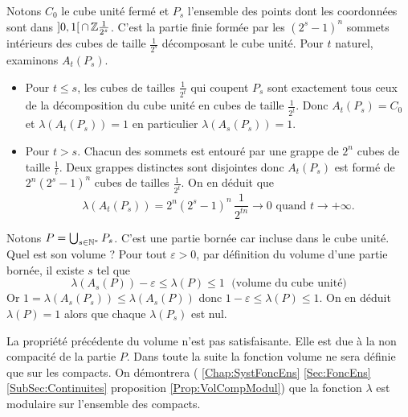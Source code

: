 \begin{explen}\label{exple:VolSommetsBorn}
Notons $C_0$ le cube unité fermé et $P_s$ l'ensemble des points dont les coordonnées sont dans $]0,1[\,\cap\, \mathbb{Z} \frac{1}{2^s}$. C'est la partie finie formée par les $(2^s -1)^n$ sommets intérieurs des cubes de taille $\frac{1}{2^s}$ décomposant le cube unité.\newline
Pour $t$ naturel, examinons $A_t(P_s)$.
  \begin{itemize}
    \item Pour $t \leq s$, les cubes de tailles $\frac{1}{2^t}$ qui coupent $P_s$ sont exactement tous ceux de la décomposition du cube unité en cubes de taille $\frac{1}{2^t}$. Donc $A_t(P_s) = C_0$ et $\lambda(A_t(P_s))=1$ en particulier $\lambda(A_s(P_s))=1$.
    \item Pour $t > s$. Chacun des sommets est entouré par une grappe de $2^n$ cubes de taille $\frac{1}{t}$. Deux grappes distinctes sont disjointes donc $A_t(P_s)$ est formé de $2^n (2^s -1)^n$ cubes de tailles $\frac{1}{2^t}$. On en déduit que
      \begin{displaymath}
  \lambda(A_t(P_s)) = 2^n (2^s -1)^n\, \frac{1}{2^{tn}} \rightarrow 0 \text{ quand } t\rightarrow +\infty.
      \end{displaymath}
  \end{itemize}
Notons $P = \bigcup_{s \in \mathbb{N}^*} P_s$. C'est une partie bornée car incluse dans le cube unité. Quel est son volume ?\newline
Pour tout $\varepsilon >0$, par définition du volume d'une partie bornée, il existe $s$ tel que
\begin{displaymath}
 \lambda(A_s(P))- \varepsilon \leq \lambda(P) \leq 1 \; \text{ (volume du cube unité)}
\end{displaymath}
Or  $1 = \lambda(A_s(P_s))\leq \lambda(A_s(P))$ donc $1 - \varepsilon \leq \lambda(P) \leq 1$.\newline
On en déduit $\lambda(P)=1$ alors que chaque $\lambda(P_s)$ est nul.
\end{explen}

\noindent La propriété précédente du volume n'est pas satisfaisante. Elle est due à la non compacité de la partie $P$. Dans toute la suite la fonction volume ne sera définie que sur les compacts.\newline
On démontrera ( \ref{Chap:SystFoncEns} \ref{Sec:FoncEns} \ref{SubSec:Continuites} proposition \ref{Prop:VolCompModul}) que la fonction $\lambda$ est modulaire sur l'ensemble des compacts.


